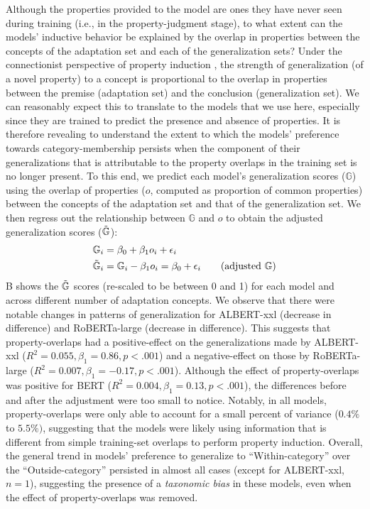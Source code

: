\documentclass[10pt,letterpaper]{article}
\begin{document}
Although the properties provided to the model are ones they have never seen during training (i.e., in the property-judgment stage), to what extent can the models' inductive behavior be explained by the overlap in properties between the concepts of the adaptation set and each of the generalization sets? Under the connectionist perspective of property induction \citep{sloman1993feature, rogers2004semantic}, the strength of generalization (of a novel property) to a concept is proportional to the overlap in properties between the premise (adaptation set) and the conclusion (generalization set).
We can reasonably expect this to translate to the models that we use here,
especially since they are trained to predict the presence and absence of properties.
It is therefore revealing to understand the extent to which the models' preference towards category-membership persists when the component of their generalizations that is attributable to the property overlaps in the training set is no longer present.
To this end, we  predict each model's generalization scores ($\mathbb{G}$) using the overlap of properties ($o$, computed as proportion of common properties) between the concepts of the adaptation set and that of the generalization set. We then regress out the relationship between $\mathbb{G}$ and $o$ to obtain the adjusted generalization scores ($\Tilde{\mathbb{G}}$):
\begin{align*}
    \mathbb{G}_i &= \beta_0 + \beta_1 o_i + \epsilon_i\\
    \Tilde{\mathbb{G}}_i &= \mathbb{G}_i - \beta_1 o_i = \beta_0 + \epsilon_i \tag{adjusted $\mathbb{G}$}
\end{align*}
B shows the $\Tilde{\mathbb{G}}$ scores (re-scaled to be between 0 and 1) for each model and across different number of adaptation concepts.
We observe that there were notable changes in patterns of generalization for ALBERT-xxl (decrease in difference) and RoBERTa-large (decrease in difference). 
This suggests that property-overlaps had a positive-effect on the generalizations made by ALBERT-xxl ($R^2=0.055, \beta_1 = 0.86, p < .001$) and a negative-effect on those by RoBERTa-large ($R^2=0.007, \beta_1 = -0.17, p < .001$). Although the effect of property-overlaps was positive for BERT ($R^2=0.004, \beta_1 = 0.13, p < .001$), the differences before and after the adjustment were too small to notice. 
Notably, in all models, property-overlaps were only able to account for a small percent of variance ($0.4\%$ to $5.5\%)$, suggesting that the models were likely using information that is different from simple training-set overlaps to perform property induction.
Overall, the general trend in models' preference to generalize to ``Within-category'' over the ``Outside-category'' persisted in almost all cases (except for ALBERT-xxl, $n=1$), suggesting the presence of a \textit{taxonomic bias} in these models, even when the effect of property-overlaps was removed.
\end{document}
